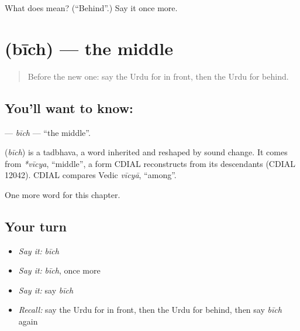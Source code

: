 \begin{tcolorbox}[breakable,colback=teal!4,colframe=teal!35!black,title={Before you move on}]
What does  mean? (\textquotedblleft{}Behind\textquotedblright{}.) Say it once more.
\end{tcolorbox}
\section[\texorpdfstring{\ur{بیچ} (bīch)}{بیچ (bīch)}]{ (bīch) — the middle}

\label{lesson:UR-C97-bich}



\begin{quote}
Before the new one: say the Urdu for in front, then the Urdu for behind.
\end{quote}

\subsection*{You'll want to know: }
\textbf{} — \emph{bīch} — \textquotedblleft{}the middle\textquotedblright{}.

\begin{cousinweb}
\textbf{} (\emph{bīch}) is a tadbhava, a word inherited and reshaped by sound change. It comes from \emph{*vīcya}, \textquotedblleft{}middle\textquotedblright{}, a form CDIAL reconstructs from its descendants (CDIAL 12042). CDIAL compares Vedic \emph{vīcyā}, \textquotedblleft{}among\textquotedblright{}.
\end{cousinweb}

\begin{grammarlens}[title={What you've built}]
One more word for this chapter.
\end{grammarlens}

\subsection*{Your turn}
\begin{itemize}
\raggedright
  \item \emph{Say it:} \emph{bīch}
  \item \emph{Say it:} \emph{bīch}, once more
  \item \emph{Say it:} say \emph{bīch}
  \item \emph{Recall:} say the Urdu for in front, then the Urdu for behind, then say \emph{bīch} again
\end{itemize}

